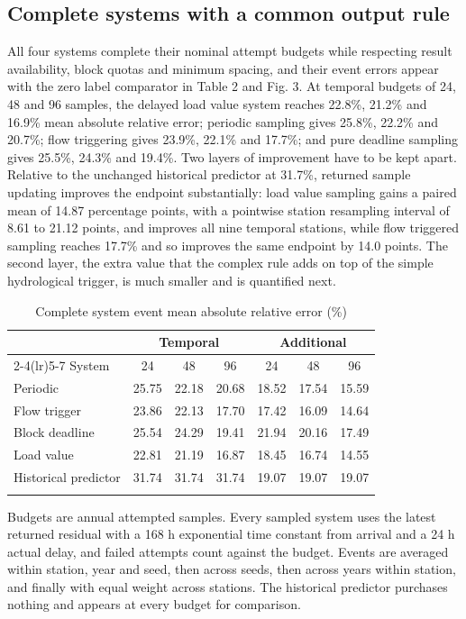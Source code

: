 \documentclass[lineno,pdflatex,sn-apa]{sn-jnl}%
\theoremstyle{thmstyleone}%
\theoremstyle{thmstyletwo}%
\theoremstyle{thmstylethree}%
\begin{document}
\subsection{Complete systems with a common output rule}

All four systems complete their nominal attempt budgets while respecting result availability, block quotas and minimum spacing, and their event errors appear with the zero label comparator in Table 2 and Fig. 3. At temporal budgets of 24, 48 and 96 samples, the delayed load value system reaches 22.8\%, 21.2\% and 16.9\% mean absolute relative error; periodic sampling gives 25.8\%, 22.2\% and 20.7\%; flow triggering gives 23.9\%, 22.1\% and 17.7\%; and pure deadline sampling gives 25.5\%, 24.3\% and 19.4\%. Two layers of improvement have to be kept apart. Relative to the unchanged historical predictor at 31.7\%, returned sample updating improves the endpoint substantially: load value sampling gains a paired mean of 14.87 percentage points, with a pointwise station resampling interval of 8.61 to 21.12 points, and improves all nine temporal stations, while flow triggered sampling reaches 17.7\% and so improves the same endpoint by 14.0 points. The second layer, the extra value that the complex rule adds on top of the simple hydrological trigger, is much smaller and is quantified next.

\begin{table}[htbp]
\caption{Complete system event mean absolute relative error (\%)}\label{tab:2}
\footnotesize
\setlength{\tabcolsep}{2pt}
\begin{tabular}{@{}lcccccc@{}}
\toprule
& \multicolumn{3}{c}{Temporal} & \multicolumn{3}{c}{Additional} \\
\cmidrule(lr){2-4}\cmidrule(lr){5-7}
System & 24 & 48 & 96 & 24 & 48 & 96 \\
\midrule
Periodic & 25.75 & 22.18 & 20.68 & 18.52 & 17.54 & 15.59\\
Flow trigger & 23.86 & 22.13 & 17.70 & 17.42 & 16.09 & 14.64\\
Block deadline & 25.54 & 24.29 & 19.41 & 21.94 & 20.16 & 17.49\\
Load value & 22.81 & 21.19 & 16.87 & 18.45 & 16.74 & 14.55\\
Historical predictor & 31.74 & 31.74 & 31.74 & 19.07 & 19.07 & 19.07\\
\botrule
\end{tabular}
\end{table}

Budgets are annual attempted samples. Every sampled system uses the latest returned residual with a 168 h exponential time constant from arrival and a 24 h actual delay, and failed attempts count against the budget. Events are averaged within station, year and seed, then across seeds, then across years within station, and finally with equal weight across stations. The historical predictor purchases nothing and appears at every budget for comparison.
\end{document}
